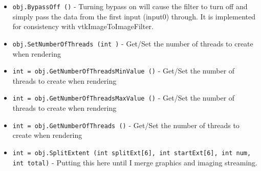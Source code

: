 \begin{itemize}
\item  \verb|obj.BypassOff ()| -  Turning bypass on will cause the filter to turn off and
 simply pass the data from the first input (input0) through.  
 It is implemented for consistency with vtkImageToImageFilter.

\item  \verb|obj.SetNumberOfThreads (int )| -  Get/Set the number of threads to create when rendering

\item  \verb|int = obj.GetNumberOfThreadsMinValue ()| -  Get/Set the number of threads to create when rendering

\item  \verb|int = obj.GetNumberOfThreadsMaxValue ()| -  Get/Set the number of threads to create when rendering

\item  \verb|int = obj.GetNumberOfThreads ()| -  Get/Set the number of threads to create when rendering

\item  \verb|int = obj.SplitExtent (int splitExt[6], int startExt[6], int num, int total)| -  Putting this here until I merge graphics and imaging streaming.

\end{itemize}

